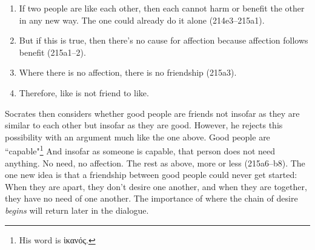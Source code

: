 \documentclass[11pt]{article}
\begin{document}
\begin{enumerate}
    \item If two people are like each other, then each cannot harm or benefit the other in any new way.  The one could already do it alone (214e3--215a1).
    \item But if this is true, then there's no cause for affection because affection follows benefit (215a1--2).
    \item Where there is no affection, there is no friendship (215a3).
    \item Therefore, like is not friend to like.
\end{enumerate}

Socrates then considers whether good people are friends not insofar as they are similar to each other but insofar as they are good.  However, he rejects this possibility with an argument much like the one above.  Good people are ``capable"\footnote{His word is ἱκανός.}  And insofar as someone is capable, that person does not need anything.  No need, no affection.  The rest as above, more or less (215a6--b8).  The one new idea is that a friendship between good people could never get started: When they are apart, they don't desire one another, and when they are together, they have no need of one another.  The importance of where the chain of desire \emph{begins} will return later in the dialogue.

\newpage


\end{document}
